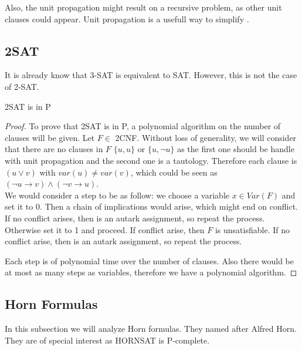Also, the unit propagation might result on a recursive problem, as other unit clauses could appear. Unit propagation is a usefull way to simplify . \\ 






\subsection{2SAT}
It is already know that 3-SAT is equivalent to SAT. However, this is not the case of 2-SAT.

\begin{proposition}
  2SAT is in P 
\end{proposition}
\begin{proof}

  To prove that 2SAT is in P, a polynomial algorithm on the number of clauses will be given. Let $F \in$ 2CNF.  Without loss of generality, we will consider that there are no clauses in $F$ $\{u,u\}$ or $\{u,\neg u\}$ as the first one should be handle with unit propagation and the second one is a tautology. Therefore each clause is $(u \vee v)$ with $var(u) \ne var(v)$, which could be seen as $(\neg u \rightarrow v) \wedge (\neg v \rightarrow u)$.\\


  
  We would consider a step to be as follow: we choose a variable $x \in Var(F)$ and set it to 0. Then a chain of implications would arise, which might end on conflict. If no conflict arises, then is an autark assignment, so repeat the process. Otherwise set it to 1 and proceed. If conflict arise, then $F$ is unsatisfiable. If no conflict arise, then is an autark assignment, so repeat the process.
  

  Each step is of polynomial time over the number of clauses. Also there would be at most as many steps as variables, therefore we have a polynomial algorithm.
  
 
\end{proof}

\subsection{Horn Formulas}

\label{sub:Horn}

In this subsection we will analyze Horn formulas. They named after Alfred Horn\cite{horn1951sentences}. They are of special interest as HORNSAT is P-complete.


